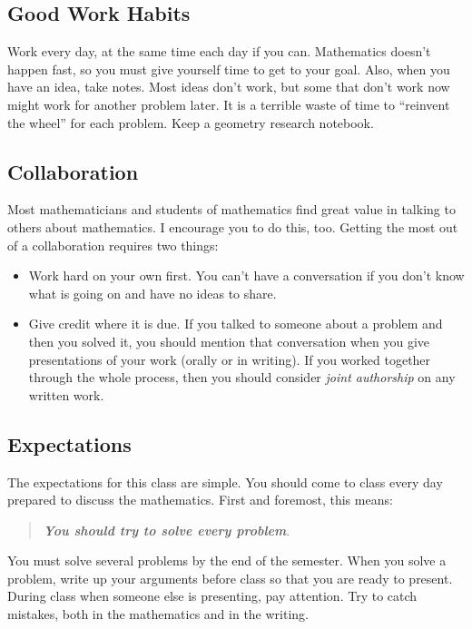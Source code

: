\documentclass{tufte-handout}
\theoremstyle{definition}
\begin{document}
\subsection*{Good Work Habits}
Work every day, at the same time each day if you can.
Mathematics doesn't happen fast, so you must give yourself time to get to your goal.
Also, when you have an idea, take notes.
Most ideas don't work, but some that don't work now might work for another problem later.
It is a terrible waste of time to ``reinvent the wheel'' for each problem.
Keep a geometry research notebook.

\subsection*{Collaboration}
Most mathematicians and students of mathematics find great value in talking to others about mathematics.
I encourage you to do this, too.
Getting the most out of a collaboration requires two things:
\begin{itemize}
\item Work hard on your own first.
You can't have a conversation if you don't know what is going on and have no ideas to share.

\item Give credit where it is due.
If you talked to someone about a problem and then you solved it, you should mention that conversation when you give presentations of your work (orally or in writing).
If you worked together through the whole process, then you should consider \emph{joint authorship} on any written work.

\end{itemize}


\subsection*{Expectations}
The expectations for this class are simple.
You should come to class every day prepared to discuss the mathematics. First and foremost, this means:
\begin{quotation}
\textbf{\emph{You should try to solve every problem}}.
\end{quotation}
You must solve several problems by the end of the semester.
When you solve a problem, write up your arguments before class so that you are ready to present.
During class when someone else is presenting, pay attention.
Try to catch  mistakes, both in the mathematics and in the writing.
\end{document}
